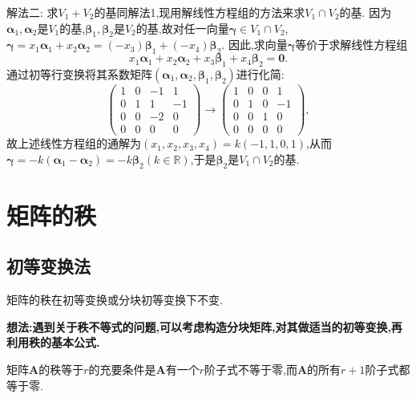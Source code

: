 \documentclass[lang=cn,newtx,10pt,scheme=chinese]{elegantbook}
\begin{document}
\begin{solution}
{\color{blue}解法二:} 求\(V_1 + V_2\)的基同解法1,现用解线性方程组的方法来求\(V_1\cap V_2\)的基. 因为\(\boldsymbol{\alpha}_1,\boldsymbol{\alpha}_2\)是\(V_1\)的基,\(\boldsymbol{\beta}_1,\boldsymbol{\beta}_2\)是\(V_2\)的基,故对任一向量\(\boldsymbol{\gamma}\in V_1\cap V_2\),\(\boldsymbol{\gamma}=x_1\boldsymbol{\alpha}_1 + x_2\boldsymbol{\alpha}_2=(-x_3)\boldsymbol{\beta}_1 + (-x_4)\boldsymbol{\beta}_2\). 因此,求向量\(\boldsymbol{\gamma}\)等价于求解线性方程组
\[
x_1\boldsymbol{\alpha}_1 + x_2\boldsymbol{\alpha}_2 + x_3\boldsymbol{\beta}_1 + x_4\boldsymbol{\beta}_2=\boldsymbol{0}.
\]
通过初等行变换将其系数矩阵\((\boldsymbol{\alpha}_1,\boldsymbol{\alpha}_2,\boldsymbol{\beta}_1,\boldsymbol{\beta}_2)\)进行化简:
\[
\begin{pmatrix}
1&0&-1&1\\
0&1&1&-1\\
0&0&-2&0\\
0&0&0&0
\end{pmatrix}\to
\begin{pmatrix}
1&0&0&1\\
0&1&0&-1\\
0&0&1&0\\
0&0&0&0
\end{pmatrix},
\]
故上述线性方程组的通解为\((x_1,x_2,x_3,x_4)=k(-1,1,0,1)\),从而\(\boldsymbol{\gamma}=-k(\boldsymbol{\alpha}_1 - \boldsymbol{\alpha}_2)=-k\boldsymbol{\beta}_2(k\in\mathbb{R})\),于是\(\boldsymbol{\beta}_2\)是\(V_1\cap V_2\)的基. 
\end{solution}


\section{矩阵的秩}

\subsection{初等变换法}

矩阵的秩在初等变换或分块初等变换下不变.

\textbf{想法:遇到关于秩不等式的问题,可以考虑构造分块矩阵,对其做适当的初等变换,再利用秩的基本公式.}

\begin{theorem}\label{theorem:矩阵的秩与子式}
矩阵\(\boldsymbol{A}\)的秩等于\(r\)的充要条件是\(\boldsymbol{A}\)有一个\(r\)阶子式不等于零,而\(\boldsymbol{A}\)的所有\(r + 1\)阶子式都等于零.
\end{theorem}
\end{document}
